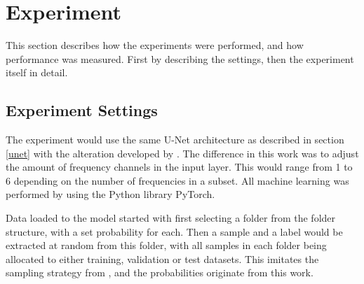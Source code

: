 \section{Experiment} \label{Experiment}
    This section describes how the experiments were performed, and how performance was measured. First by describing the settings, then the experiment itself in detail.
    
    \subsection{Experiment Settings} \label{Experiment settings}
        The experiment would use the same U-Net architecture as described in section \ref{unet} with the alteration developed by \citeauthor{brautaset2020acoustic}\cite{brautaset2020acoustic}. The difference in this work was to adjust the amount of frequency channels in the input layer. This would range from 1 to 6 depending on the number of frequencies in a subset. All machine learning was performed by using the Python library PyTorch\cite{NEURIPS2019_9015}. %
        
        Data loaded to the model started with first selecting a folder from the folder structure, with a set probability for each. Then a sample and a label would be extracted at random from this folder, with all samples in each folder being allocated to either training, validation or test datasets. This imitates the sampling strategy from \citeauthor{brautaset2020acoustic}\cite{brautaset2020acoustic}, and the probabilities originate from this work.
        

